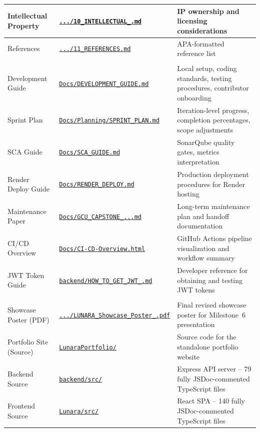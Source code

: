 \documentclass[12pt,letterpaper]{article}
\begin{document}
{\begin{longtable}{|>{\raggedright\arraybackslash}p{3.5cm}|>{\raggedright\arraybackslash}p{4.8cm}|>{\raggedright\arraybackslash}p{4.7cm}|}
\hline
Intellectual Property & \href{\ghblob/Docs/Capstone-Papers/10_INTELLECTUAL_PROPERTY.md}{\texttt{.../10\_INTELLECTUAL\_.md}} & IP ownership and licensing considerations \\
\hline
\rowcolor{TableRowAlt}
References & \href{\ghblob/Docs/Capstone-Papers/11_REFERENCES.md}{\texttt{.../11\_REFERENCES.md}} & APA-formatted reference list \\
\hline

\multicolumn{3}{|l|}{\cellcolor{LunaraBlue!10}\textbf{Operational \& Developer Guides}} \\
\hline
Development Guide & \href{\ghblob/Docs/DEVELOPMENT_GUIDE.md}{\texttt{Docs/DEVELOPMENT\_GUIDE.md}} & Local setup, coding standards, testing procedures, contributor onboarding \\
\hline
\rowcolor{TableRowAlt}
Sprint Plan & \href{\ghblob/Docs/Planning/SPRINT_PLAN.md}{\texttt{Docs/Planning/SPRINT\_PLAN.md}} & Iteration-level progress, completion percentages, scope adjustments \\
\hline
SCA Guide & \href{\ghblob/Docs/SCA_GUIDE.md}{\texttt{Docs/SCA\_GUIDE.md}} & SonarQube quality gates, metrics interpretation \\
\hline
\rowcolor{TableRowAlt}
Render Deploy Guide & \href{\ghblob/Docs/RENDER_DEPLOY.md}{\texttt{Docs/RENDER\_DEPLOY.md}} & Production deployment procedures for Render hosting \\
\hline
Maintenance Paper & \href{\ghblob/Docs/GCU_CAPSTONE_MAINTENANCE_PAPER.md}{\texttt{Docs/GCU\_CAPSTONE\_...md}} & Long-term maintenance plan and handoff documentation \\
\hline
\rowcolor{TableRowAlt}
CI/CD Overview & \href{\ghblob/Docs/CI-CD-Overview.html}{\texttt{Docs/CI-CD-Overview.html}} & GitHub Actions pipeline visualization and workflow summary \\
\hline
JWT Token Guide & \href{\ghblob/backend/HOW_TO_GET_JWT_TOKEN.md}{\texttt{backend/HOW\_TO\_GET\_JWT\_.md}} & Developer reference for obtaining and testing JWT tokens \\
\hline

\multicolumn{3}{|l|}{\cellcolor{LunaraBlue!10}\textbf{Presentation Assets \& Source Code}} \\
\hline
\rowcolor{TableRowAlt}
Showcase Poster (PDF) & \href{\ghblob/Docs/Presentations/LUNARA_Showcase_Poster_REVISED.pdf}{\texttt{.../LUNARA\_Showcase\_Poster\_.pdf}} & Final revised showcase poster for Milestone~6 presentation \\
\hline
Portfolio Site (Source) & \href{\ghtree/LunaraPortfolio}{\texttt{LunaraPortfolio/}} & Source code for the standalone portfolio website \\
\hline
\rowcolor{TableRowAlt}
Backend Source & \href{\ghtree/backend/src}{\texttt{backend/src/}} & Express API server -- 79 fully JSDoc-commented TypeScript files \\
\hline
Frontend Source & \href{\ghtree/Lunara/src}{\texttt{Lunara/src/}} & React SPA -- 140 fully JSDoc-commented TypeScript files \\
\hline


\end{longtable}}
\end{document}
